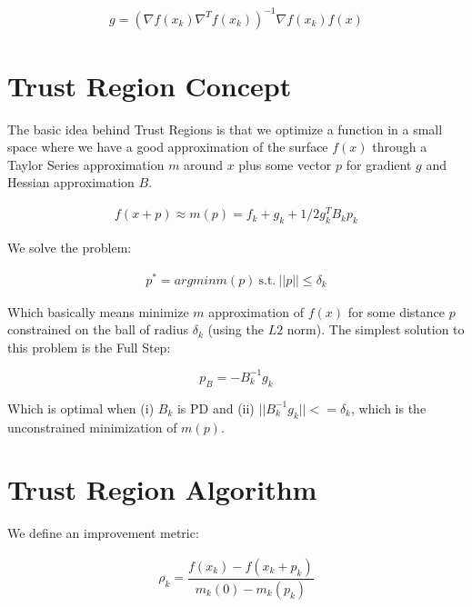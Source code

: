 \documentclass[12pt]{article}
\begin{document}
\begin{align*}
g= (\nabla f(x_k) \nabla^T f(x_k))^{-1} \nabla f(x_k) f(x)
\end{align*}

\section{Trust Region Concept}

The basic idea behind Trust Regions is that we optimize a function in a small space where we have a good approximation of the surface $f(x)$ through a Taylor Series approximation $m$ around $x$ plus some vector $p$ for gradient $g$ and Hessian approximation $B$. 

\vspace{5mm}

\begin{align*}
f(x+p) \approx m(p)=f_k+g_k+1/2g_k^TB_kp_k
\end{align*}

\vspace{5mm}

We solve the problem:

\begin{align*}
p^*=argmin m(p) \: \text{s.t.} \: ||p|| \leq \delta_k
\end{align*}

\vspace{5mm}

Which basically means minimize $m$ approximation of $f(x)$ for some distance $p$ constrained on the ball of radius $\delta_k$ (using the $L2$ norm). The simplest solution to this problem is the Full Step: 

\begin{equation}
p_{B}=-B_k^{-1}g_k
\end{equation}

\vspace{5mm}

Which is optimal when (i) $B_k$ is PD and (ii) $||B_k^{-1}g_k||<=\delta_k$, which is the unconstrained minimization of $m(p)$. 

\section{Trust Region Algorithm}

We define an improvement metric:

\vspace{5mm}

\begin{align*}
\rho_k=\dfrac{f(x_k)-f(x_k+p_k)}{m_k(0)-m_k(p_k)}
\end{align*}
\end{document}
